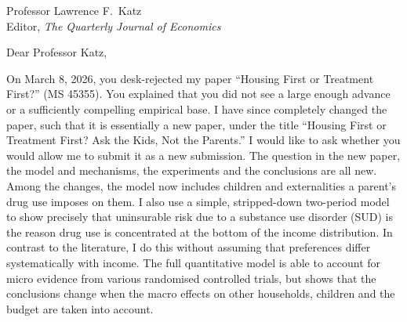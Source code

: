 \documentclass[10pt]{article}
\begin{document}
Professor Lawrence F.\ Katz\\
Editor, \textit{The Quarterly Journal of Economics}

Dear Professor Katz,

On March 8, 2026, you desk-rejected my paper ``Housing First or Treatment First?'' (MS 45355). You explained that you did not see a large enough advance or a sufficiently compelling empirical base. I have since completely changed the paper, such that it is essentially a new paper, under the title ``Housing First or Treatment First? Ask the Kids, Not the Parents.'' I would like to ask whether you would allow me to submit it as a new submission. The question in the new paper, the model and mechanisms, the experiments and the conclusions are all new. Among the changes, the model now includes children and externalities a parent's drug use imposes on them. I also use a simple, stripped-down two-period model to show precisely that uninsurable risk due to a substance use disorder (SUD) is the reason drug use is concentrated at the bottom of the income distribution. In contrast to the literature, I do this without assuming that preferences differ systematically with income. The full quantitative model is able to account for micro evidence from various randomised controlled trials, but shows that the conclusions change when the macro effects on other households, children and the budget are taken into account.
\end{document}
